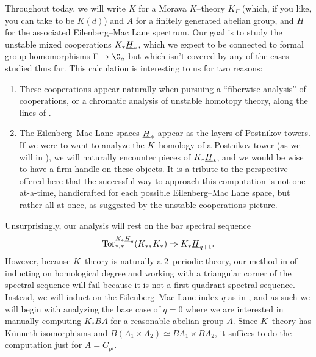 Throughout today, we will write $K$ for a Morava $K$--theory $K_\Gamma$ (which, if you like, you can take to be $K(d)$) and $A$ for a finitely generated abelian group, and $H$ for the associated Eilenberg--Mac Lane spectrum.  Our goal is to study the unstable mixed cooperations $K_* \underline{\smash{H}}_{*}$, which we expect to be connected to formal group homomorphisms $\Gamma \to \G_a$ but which isn't covered by any of the cases studied thus far.  This calculation is interesting to us for two reasons:
\begin{enumerate}
\item These cooperations appear naturally when pursuing a ``fiberwise analysis'' of cooperations, or a chromatic analysis of unstable homotopy theory, along the lines of .
\item The Eilenberg--Mac Lane spaces $\underline{\smash{H}}_{*}$ appear as the layers of Postnikov towers.  If we were to want to analyze the $K$--homology of a Postnikov tower (as we will in ), we will naturally encounter pieces of $K_* \underline{\smash{H}}_{*}$, and we would be wise to have a firm handle on these objects.  It is a tribute to the perspective offered here that the successful way to approach this computation is not one-at-a-time, handicrafted for each possible Eilenberg--Mac Lane space, but rather all-at-once, as suggested by the unstable cooperations picture.
\end{enumerate}

Unsurprisingly, our analysis will rest on the bar spectral sequence \[\operatorname{Tor}^{K_* \underline{\smash{H}}_{q}}_{*, *}(K_*, K_*) \Rightarrow K_* \underline{\smash{H}}_{q+1}.\]  However, because $K$--theory is naturally a $2$--periodic theory, our method in  of inducting on homological degree and working with a triangular corner of the spectral sequence will fail because it is not a first-quadrant spectral sequence.  Instead, we will induct on the Eilenberg--Mac Lane index $q$ as in , and as such we will begin with analyzing the base case of $q = 0$ where we are interested in manually computing $K_* BA$ for a reasonable abelian group $A$.  Since $K$--theory has K\"unneth isomorphisms and $B(A_1 \times A_2) \simeq BA_1 \times BA_2$, it suffices to do the computation just for $A = C_{p^j}$. 

